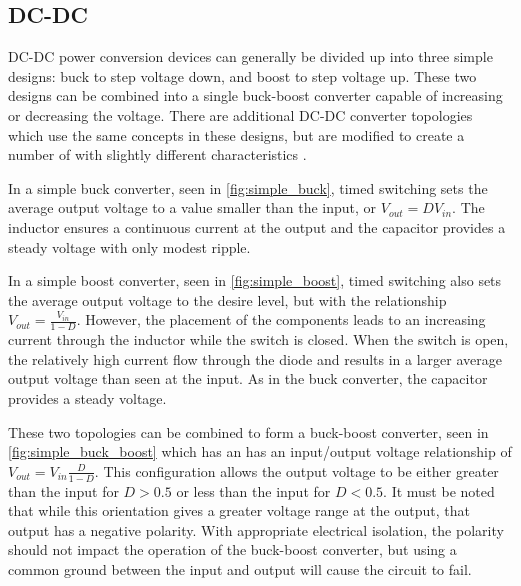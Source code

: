 \subsection{DC-DC}
DC-DC power conversion devices can generally be divided up into three simple designs: buck to step voltage down, and boost to step voltage up. These two designs can be combined into a single buck-boost converter capable of increasing or decreasing the voltage. There are additional DC-DC converter topologies which use the same concepts in these designs, but are modified to create a number of  with slightly different characteristics \cite{Mohan2003}.

In a simple buck converter, seen in \autoref{fig:simple_buck}, timed switching sets the average output voltage to a value smaller than the input, or $V_{out} = D V_{in}$. The inductor ensures a continuous current at the output and the capacitor provides a steady voltage with only modest ripple. 



In a simple boost converter, seen in \autoref{fig:simple_boost}, timed switching also sets the average output voltage to the desire level, but with the relationship $V_{out} =\frac{V_{in}}{1-D}$. However, the placement of the components leads to an increasing current through the inductor while the switch is closed. When the switch is open, the relatively high current flow through the diode and results in a larger average output voltage than seen at the input. As in the buck converter, the capacitor provides a steady voltage. 



These two topologies can be combined to form a buck-boost converter, seen in \autoref{fig:simple_buck_boost} which has an has an input/output voltage relationship of $V_{out} = V_{in}\frac{D}{1-D}$. This configuration allows the output voltage to be either greater than the input for $D > 0.5$ or less than the input for $D < 0.5$. It must be noted that while this orientation gives a greater voltage range at the output, that output has a negative polarity. With appropriate electrical isolation, the polarity should not impact the operation of the buck-boost converter, but using a common ground between the input and output will cause the circuit to fail.

